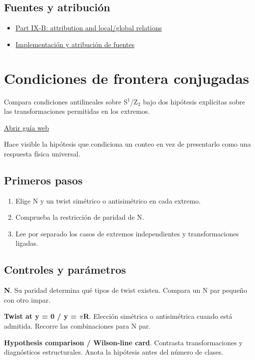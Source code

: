 \documentclass[11pt,a4paper]{article}
\begin{document}
\subsection*{Fuentes y atribución}
\begin{itemize}
\item \href{https://karlesmarin.github.io/ghu-explorer/papers/part-ix-b/index.html}{Part IX-B: attribution and local/global relations}
\item \href{https://github.com/karlesmarin/ghu-lab/blob/main/src/sections/relations_section.js}{Implementación y atribución de fuentes}
\end{itemize}
\section{Condiciones de frontera conjugadas}
Compara condiciones antilineales sobre S\ensuremath{{}^{1}}/Z\ensuremath{{}_{2}} bajo dos hipótesis explícitas sobre las transformaciones permitidas en los extremos.

\href{https://karlesmarin.github.io/ghu-explorer/guide/es/cbclass/index.html}{Abrir guía web}

Hace visible la hipótesis que condiciona un conteo en vez de presentarlo como una respuesta física universal.
\subsection*{Primeros pasos}
\begin{enumerate}
\item Elige N y un twist simétrico o antisimétrico en cada extremo.
\item Comprueba la restricción de paridad de N.
\item Lee por separado los casos de extremos independientes y transformaciones ligadas.
\end{enumerate}
\subsection*{Controles y parámetros}
\textbf{N}. Su paridad determina qué tipos de twist existen. Compara un N par pequeño con otro impar.

\textbf{Twist at y = 0 / y = \ensuremath{\pi}R}. Elección simétrica o antisimétrica cuando está admitida. Recorre las combinaciones para N par.

\textbf{Hypothesis comparison / Wilson-line card}. Contrasta transformaciones y diagnósticos estructurales. Anota la hipótesis antes del número de clases.
\end{document}
